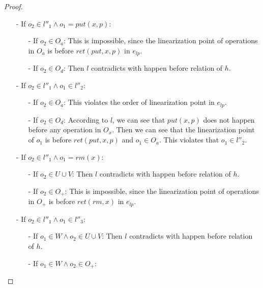 \begin {proof}
\begin{itemize}
\item[-] If $o_2 \in l''_1 \wedge o_1 = \textit{put}(x,p)$:
    \begin{itemize}
    \setlength{\itemsep}{0.5pt}
    \item[-] If $o_2 \in O_a$: This is impossible, since the linearization point of operations in $O_a$ is before $\textit{ret}(\textit{put},x,p)$ in $e_{\textit{lp}}$.

    \item[-] If $o_2 \in O_d$: Then $l$ contradicts with happen before relation of $h$.
    \end{itemize}

\item[-] If $o_2 \in l''_1 \wedge o_1 \in l''_2$:
    \begin{itemize}
    \setlength{\itemsep}{0.5pt}
    \item[-] If $o_2 \in O_a$: This violates the order of linearization point in $e_{\textit{lp}}$.

    \item[-] If $o_2 \in O_d$: According to $l$, we can see that $\textit{put}(x,p)$ does not happen before any operation in $O_x$. Then we can see that the linearization point of $o_1$ is before $\textit{ret}(\textit{put},x,p)$ and $o_1 \in O_a$. This violates that $o_1 \in l''_2$.
    \end{itemize}

\item[-] If $o_2 \in l''_1 \wedge o_1 = \textit{rm}(x)$:
    \begin{itemize}
    \setlength{\itemsep}{0.5pt}
    \item[-] If $o_2 \in U \cup V$: Then $l$ contradicts with happen before relation of $h$.

    \item[-] If $o_2 \in O_+$: This is impossible, since the linearization point of operations in $O_+$ is before $\textit{ret}(\textit{rm},x)$ in $e_{\textit{lp}}$.
    \end{itemize}

\item[-] If $o_2 \in l''_1 \wedge o_1 \in l''_3$:
    \begin{itemize}
    \setlength{\itemsep}{0.5pt}
    \item[-] If $o_1 \in W \wedge o_2 \in U \cup V$: Then $l$ contradicts with happen before relation of $h$.

    \item[-] If $o_1 \in W \wedge o_2 \in O_+$:


\end{itemize}
\end{itemize}
\end{proof}
